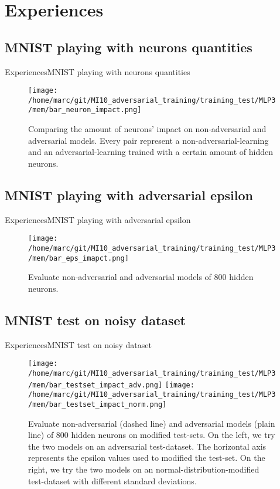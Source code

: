 \documentclass[10pt]{beamer}
\begin{document}
\section{Experiences}

\subsection{MNIST playing with neurons quantities}
\begin{frame}{Experiences}{MNIST playing with neurons quantities}
  \pause
  \begin{figure}
    \centering
    \texttt{[image: /home/marc/git/MI10\_adversarial\_training/training\_test/MLP3/mem/bar\_neuron\_impact.png]}
    \caption{Comparing the amount of neurons' impact on non-adversarial and adversarial models. Every pair represent a non-adversarial-learning and an adversarial-learning trained with a certain amount of hidden neurons.}
    \label{fig:mnist_neurons}
  \end{figure}
\end{frame}

\subsection{MNIST playing with adversarial epsilon}
\begin{frame}{Experiences}{MNIST playing with adversarial epsilon}
  \pause
  \begin{figure}
    \centering
    \texttt{[image: /home/marc/git/MI10\_adversarial\_training/training\_test/MLP3/mem/bar\_eps\_imapct.png]}
    \caption{Evaluate non-adversarial and adversarial models of 800 hidden neurons.}
    \label{fig:mnist_adv_eps}
  \end{figure}
\end{frame}

\subsection{MNIST test on noisy dataset}
\begin{frame}{Experiences}{MNIST test on noisy dataset}
  \pause
  \begin{figure}
    \centering
    \texttt{[image: /home/marc/git/MI10\_adversarial\_training/training\_test/MLP3/mem/bar\_testset\_impact\_adv.png]}
    \texttt{[image: /home/marc/git/MI10\_adversarial\_training/training\_test/MLP3/mem/bar\_testset\_impact\_norm.png]}
    \caption{Evaluate non-adversarial (dashed line) and adversarial models (plain line) of 800 hidden neurons on modified test-sets. On the left, we try the two models on an adversarial test-dataset. The horizontal axis represents the epsilon values used to modified the test-set. On the right, we try the two models on an normal-distribution-modified test-dataset with different standard deviations.}
    \label{fig:mnist_adv_noisy_ds}
  \end{figure}
\end{frame}
\end{document}
